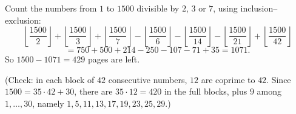 Count the numbers from $1$ to $1500$ divisible by $2$, $3$ or $7$, using inclusion--exclusion:
\[\left\lfloor\dfrac{1500}2\right\rfloor+\left\lfloor\dfrac{1500}3\right\rfloor+\left\lfloor\dfrac{1500}7\right\rfloor-\left\lfloor\dfrac{1500}6\right\rfloor-\left\lfloor\dfrac{1500}{14}\right\rfloor-\left\lfloor\dfrac{1500}{21}\right\rfloor+\left\lfloor\dfrac{1500}{42}\right\rfloor\]
\[=750+500+214-250-107-71+35=1071.\]
So $1500-1071=\boxed{429}$ pages are left.

(Check: in each block of $42$ consecutive numbers, $12$ are coprime to $42$. Since $1500=35\cdot42+30$, there are $35\cdot12=420$ in the full blocks, plus $9$ among $1,\dots,30$, namely $1,5,11,13,17,19,23,25,29$.)
